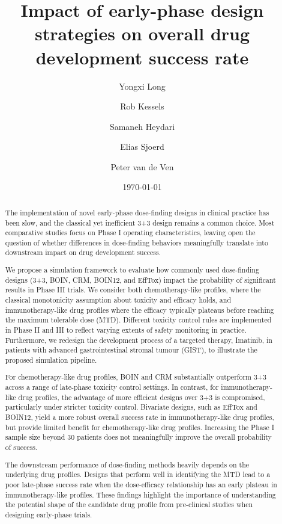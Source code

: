 \documentclass[11pt]{article}
\title{Impact of early-phase design strategies on overall drug development success rate}
\author{Yongxi Long \and Rob Kessels \and Samaneh Heydari \and Elias Sjoerd \and Peter van de Ven}
\date{\today}
\begin{document}
\maketitle
\begin{abstract}
The implementation of novel early-phase dose-finding designs in clinical practice has been slow, and the classical yet inefficient 3+3 design remains a common choice. Most comparative studies focus on Phase I operating characteristics, leaving open the question of whether differences in dose-finding behaviors meaningfully translate into downstream impact on drug development success.

We propose a simulation framework to evaluate how commonly used dose-finding designs (3+3, BOIN, CRM, BOIN12, and EffTox) impact the probability of significant results in Phase III trials. We consider both chemotherapy-like profiles, where the classical monotonicity assumption about toxicity and efficacy holds, and immunotherapy-like drug profiles where the efficacy typically plateaus before reaching the maximum tolerable dose (MTD). Different toxicity control rules are implemented in Phase II and III to reflect varying extents of safety monitoring in practice. Furthermore, we redesign the development process of a targeted therapy, Imatinib, in patients with advanced gastrointestinal stromal tumour (GIST), to illustrate the proposed simulation pipeline. 

For chemotherapy-like drug profiles, BOIN and CRM substantially outperform 3+3 across a range of late-phase toxicity control settings. In contrast, for immunotherapy-like drug profiles, the advantage of more efficient designs over 3+3 is compromised, particularly under stricter toxicity control. Bivariate designs, such as EffTox and BOIN12, yield a more robust overall success rate in immunotherapy-like drug profiles, but provide limited benefit for chemotherapy-like drug profiles. Increasing the Phase I sample size beyond 30 patients does not meaningfully improve the overall probability of success.

The downstream performance of dose-finding methods heavily depends on the underlying drug profiles. Designs that perform well in identifying the MTD lead to a poor late-phase success rate when the dose-efficacy relationship has an early plateau in immunotherapy-like profiles. These findings highlight the importance of understanding the potential shape of the candidate drug profile from pre-clinical studies when designing early-phase trials. 

\end{abstract}
\end{document}
